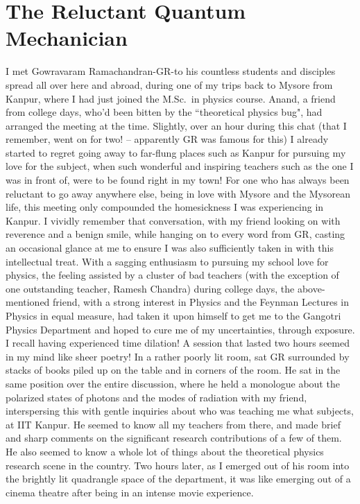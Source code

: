 \chapter[The Reluctant Quantum Mechanician]{The Reluctant Quantum Mechanician}\label{chap22}




I met Gowravaram Ramachandran-GR-to his countless students and disciples spread all over here and abroad, during one of my trips back to Mysore from Kanpur, where I had just joined the M.Sc.\ in physics course. Anand, a friend from college days, who'd been bitten by the ``theoretical physics bug", had arranged the meeting at the time. Slightly, over an hour during this chat (that I remember, went on for two! -- apparently GR was famous for this) I already started to regret going away to far-flung places such as Kanpur for pursuing my love for the subject, when such wonderful and inspiring teachers such as the one I was in front of, were to be found right in my town! For one who has always been reluctant to go away anywhere else, being in love with Mysore and the Mysorean life, this meeting only compounded the homesickness I was experiencing in Kanpur. I vividly remember that conversation, with my friend looking on with reverence and a benign smile, while hanging on to every word from GR, casting an occasional glance at me to ensure I was also sufficiently taken in with this intellectual treat. With a sagging enthusiasm to pursuing my school love for physics, the feeling assisted by a cluster of bad teachers (with the exception of one outstanding teacher, Ramesh Chandra) during college days, the above-mentioned friend, with a strong interest in Physics and the Feynman Lectures in Physics in equal measure, had taken it upon himself to get me to the Gangotri Physics Department and hoped to cure me of my uncertainties, through exposure. I recall having experienced time dilation!  A session that lasted two hours seemed in my mind like sheer poetry! In a rather poorly lit room, sat GR surrounded by stacks of books piled up on the table and in corners of the room. He sat in the same position over the entire discussion, where he held a monologue about the polarized states of photons and the modes of radiation with my friend, interspersing this with gentle inquiries about who was teaching me what subjects, at IIT Kanpur. He seemed to know all my teachers from there, and made brief and sharp comments on the significant research contributions of a few of them. He also seemed to know a whole lot of things about the theoretical physics research scene in the country. Two hours later, as I emerged out of his room into the brightly lit quadrangle space of the department, it was like emerging out of a cinema theatre after being in an intense movie experience. 

